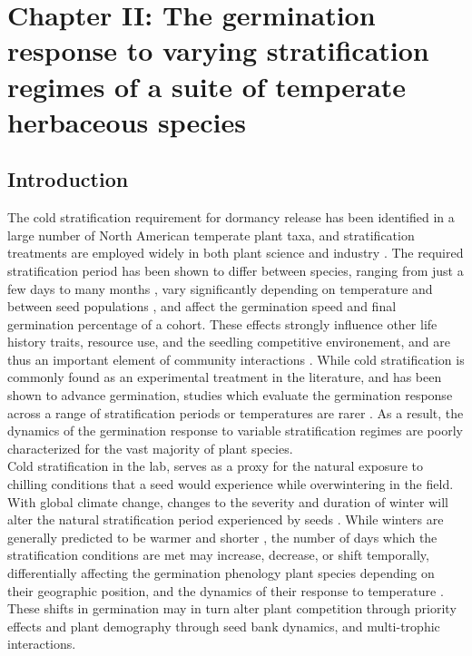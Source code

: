 \documentclass{article}\usepackage[]{graphicx}\usepackage[]{color}
\begin{document}
\section*{Chapter II: The germination response to varying stratification regimes of a suite of temperate herbaceous species}
\subsection*{Introduction}
\indent\indent The cold stratification requirement for dormancy release has been identified in a large number of North American temperate plant taxa, and stratification treatments are employed widely in both plant science and industry \citep{Hartmann_2011}. The required stratification period has been shown to differ between species, ranging from just a few days to many months \citep{Luna2009}, vary significantly depending on temperature and between seed populations \citep{Steadman2004}, and affect the germination speed and final germination percentage of a cohort. These effects strongly influence other life history traits, resource use, and the seedling competitive environement, and are thus an important element of community interactions \citep{Korner2008}.  While cold stratification is commonly found as an experimental treatment in the literature, and has been shown to advance germination, studies which evaluate the germination response across a range of stratification periods or temperatures are rarer \citep{Batlla2009}. As a result, the dynamics of the germination response to variable stratification regimes are poorly characterized for the vast majority of plant species.\\
\indent Cold stratification in the lab, serves as a proxy for the natural exposure to chilling conditions that a seed would experience while overwintering in the field. With global climate change, changes to the severity and duration of winter will alter the natural stratification period experienced by seeds \citep{Walck2011}. While winters are generally predicted to be warmer and shorter \citep{IPCC_2014}, the number of days which the stratification conditions are met may increase, decrease, or shift temporally, differentially affecting the germination phenology plant species depending on their geographic position, and the dynamics of their response to temperature \citep{Walck2011}. These shifts in germination may in turn alter plant competition through priority effects \citep{Gioria2018} and plant demography through seed bank dynamics, and multi-trophic interactions.\\
\end{document}
